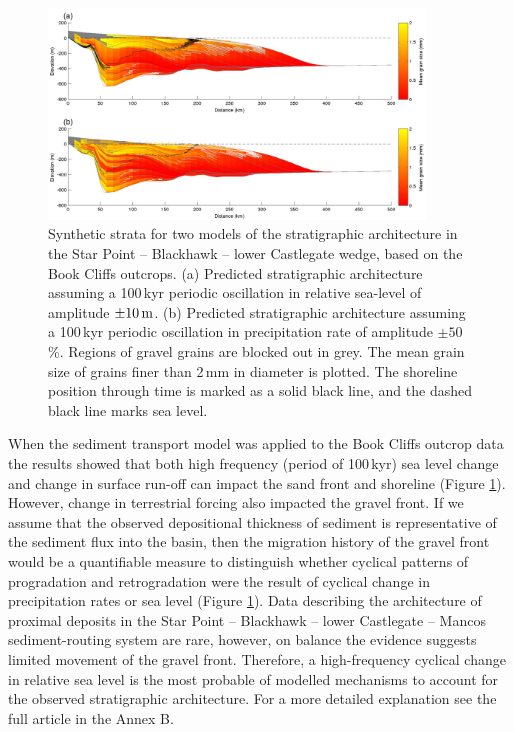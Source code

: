 \begin{figure}
\centering
\includegraphics[width=10cm]{./figures/ch2-bookcliffs-model.pdf}
\caption{Synthetic strata for two models of the stratigraphic architecture in the Star Point -- Blackhawk -- lower Castlegate wedge, based on the Book Cliffs outcrops. (a) Predicted stratigraphic architecture assuming a 100\,kyr periodic oscillation in relative sea-level of amplitude $\pm 10\rm\,m$. (b) Predicted stratigraphic architecture assuming a 100\,kyr periodic oscillation in precipitation rate of amplitude $\pm 50$\,\%. Regions of gravel grains are blocked out in grey. The mean grain size of grains finer than 2\,mm in diameter is plotted. The shoreline position through time is marked as a solid black line, and the dashed black line marks sea level.}
\label{fg:bookcliffs-model}
\end{figure}

When the sediment transport model was applied to the Book Cliffs outcrop data the results showed that both high frequency (period of 100\,kyr) sea level change and change in surface run-off can impact the sand front and shoreline (Figure \ref{fg:bookcliffs-model}). However, change in terrestrial forcing also impacted the gravel front. If we assume that the observed depositional thickness of sediment is representative of the sediment flux into the basin, then the migration history of the gravel front would be a quantifiable measure to distinguish whether cyclical patterns of progradation and retrogradation were the result of cyclical change in precipitation rates or sea level (Figure \ref{fg:bookcliffs-model}). Data describing the architecture of proximal deposits in the Star Point -- Blackhawk -- lower Castlegate -- Mancos sediment-routing system are rare, however, on balance the evidence suggests limited movement of the gravel front. Therefore, a high-frequency cyclical change in relative sea level is the most probable of modelled mechanisms to account for the observed stratigraphic architecture. For a more detailed explanation see the full article in the Annex B.

